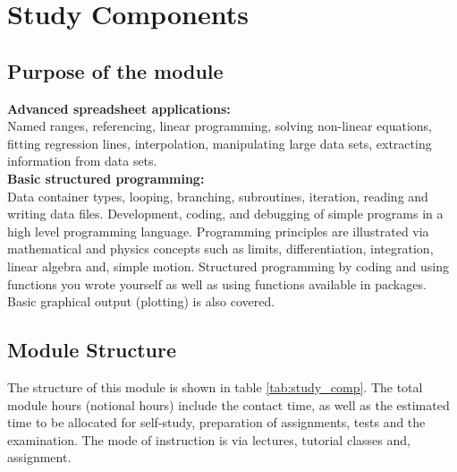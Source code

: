 \section{Study Components}
    \subsection{Purpose of the module}
        {\bf Advanced spreadsheet applications:} \\
        Named ranges, referencing, linear programming, solving non-linear
        equations, fitting regression lines, interpolation, manipulating
        large data sets, extracting information from data sets. \\

        \noindent
        {\bf Basic structured programming:} \\
        Data container types, looping, branching, subroutines, iteration,
        reading and writing data files. Development, coding, and debugging
        of simple programs in a high level programming
        language. Programming principles are illustrated via mathematical
        and physics concepts such as limits, differentiation, integration,
        linear algebra and, simple motion. Structured programming by coding
        and using functions you wrote yourself as well as using functions
        available in packages. Basic graphical output (plotting) is also
        covered.

    \subsection{Module Structure}
        The structure of this module is shown in table \ref{tab:study_comp}.
        The total module hours (notional hours) include the contact time,
        as well as the estimated time to be allocated for self-study,
        preparation of assignments, tests and the examination. The mode of
        instruction is via lectures, tutorial classes and, assignment. \\


